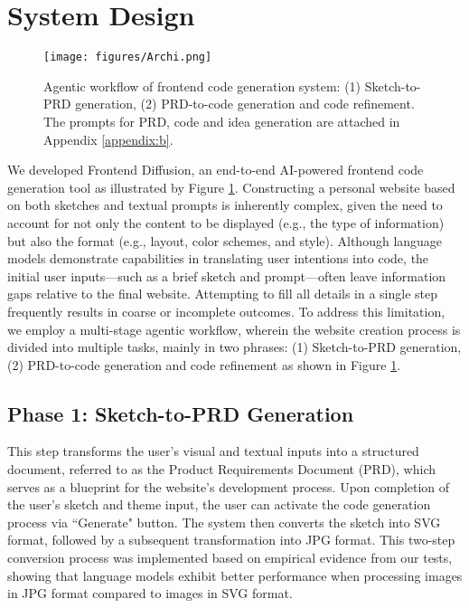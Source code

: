 \section{System Design}

\begin{figure}
  \centering
  \texttt{[image: figures/Archi.png]}
    \caption{Agentic workflow of frontend code generation system: (1) Sketch-to-PRD generation, (2) PRD-to-code generation and code refinement. The prompts for PRD, code and idea generation are attached in Appendix \ref{appendix:b}.}
    \label{fig:structure}
  \end{figure}

We developed Frontend Diffusion, an end-to-end AI-powered frontend code generation tool as illustrated by Figure \ref{fig:structure}. Constructing a personal website based on both sketches and textual prompts is inherently complex, given the need to account for not only the content to be displayed (e.g., the type of information) but also the format (e.g., layout, color schemes, and style). Although language models demonstrate capabilities in translating user intentions into code, the initial user inputs—such as a brief sketch and prompt—often leave information gaps relative to the final website. Attempting to fill all details in a single step frequently results in coarse or incomplete outcomes. To address this limitation, we employ a multi-stage agentic workflow, wherein the website creation process is divided into multiple tasks, mainly in two phrases: (1) Sketch-to-PRD generation, (2) PRD-to-code generation and code refinement as shown in Figure \ref{fig:structure}.

\subsection{Phase 1: Sketch-to-PRD Generation}

This step transforms the user's visual and textual inputs into a structured document, referred to as the Product Requirements Document (PRD), which serves as a blueprint for the website's development process. Upon completion of the user's sketch and theme input, the user can activate the code generation process via ``Generate" button. The system then converts the sketch into SVG format, followed by a subsequent transformation into JPG format. This two-step conversion process was implemented based on empirical evidence from our tests, showing that language models exhibit better performance when processing images in JPG format compared to images in SVG format.

